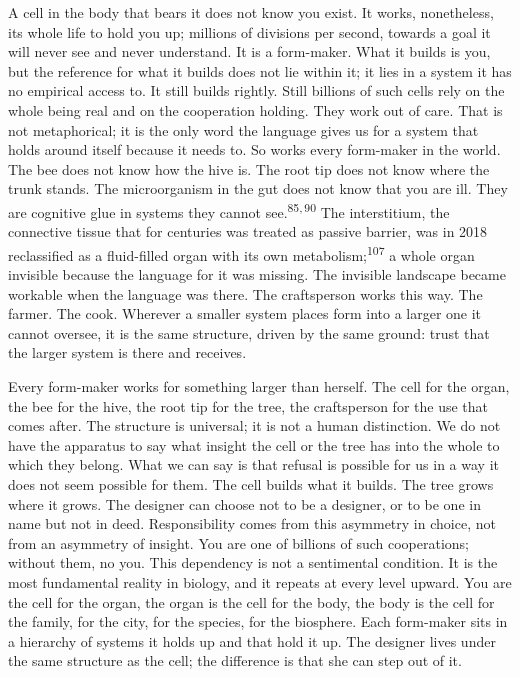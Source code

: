 \begin{widebody}
{A cell in the body that bears it does not know you exist. It works, nonetheless, its whole life to hold you up; millions of divisions per second, towards a goal it will never see and never understand. It is a form-maker. What it builds is you, but the reference for what it builds does not lie within it; it lies in a system it has no empirical access to. It still builds rightly. Still billions of such cells rely on the whole being real and on the cooperation holding. They work out of care. That is not metaphorical; it is the only word the language gives us for a system that holds around itself because it needs to. So works every form-maker in the world. The bee does not know how the hive is. The root tip does not know where the trunk stands. The microorganism in the gut does not know that you are ill. They are cognitive glue in systems they cannot see.\textsuperscript{85,\,90} The interstitium, the connective tissue that for centuries was treated as passive barrier, was in 2018 reclassified as a fluid-filled organ with its own metabolism;\textsuperscript{107} a whole organ invisible because the language for it was missing. The invisible landscape became workable when the language was there. The craftsperson works this way. The farmer. The cook. Wherever a smaller system places form into a larger one it cannot oversee, it is the same structure, driven by the same ground: trust that the larger system is there and receives.

Every form-maker works for something larger than herself. The cell for the organ, the bee for the hive, the root tip for the tree, the craftsperson for the use that comes after. The structure is universal; it is not a human distinction. We do not have the apparatus to say what insight the cell or the tree has into the whole to which they belong. What we can say is that refusal is possible for us in a way it does not seem possible for them. The cell builds what it builds. The tree grows where it grows. The designer can choose not to be a designer, or to be one in name but not in deed. Responsibility comes from this asymmetry in choice, not from an asymmetry of insight. You are one of billions of such cooperations; without them, no you. This dependency is not a sentimental condition. It is the most fundamental reality in biology, and it repeats at every level upward. You are the cell for the organ, the organ is the cell for the body, the body is the cell for the family, for the city, for the species, for the biosphere. Each form-maker sits in a hierarchy of systems it holds up and that hold it up. The designer lives under the same structure as the cell; the difference is that she can step out of it.

}
\end{widebody}
